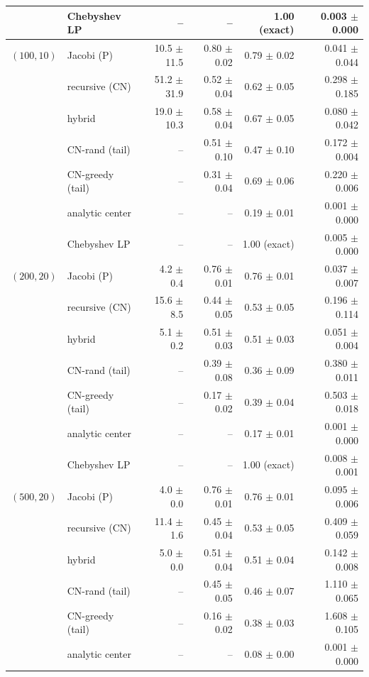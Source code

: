 \begin{table}[!htbp]
\begin{tabular}{llrrrr}
 & Chebyshev LP & -- & -- & 1.00 (exact) & 0.003 $\pm$ 0.000 \\
\midrule
$(100,10)$ & Jacobi (P) & 10.5 $\pm$ 11.5 & 0.80 $\pm$ 0.02 & 0.79 $\pm$ 0.02 & 0.041 $\pm$ 0.044 \\
 & recursive (CN) & 51.2 $\pm$ 31.9 & 0.52 $\pm$ 0.04 & 0.62 $\pm$ 0.05 & 0.298 $\pm$ 0.185 \\
 & hybrid & 19.0 $\pm$ 10.3 & 0.58 $\pm$ 0.04 & 0.67 $\pm$ 0.05 & 0.080 $\pm$ 0.042 \\
 & CN-rand (tail) & -- & 0.51 $\pm$ 0.10 & 0.47 $\pm$ 0.10 & 0.172 $\pm$ 0.004 \\
 & CN-greedy (tail) & -- & 0.31 $\pm$ 0.04 & 0.69 $\pm$ 0.06 & 0.220 $\pm$ 0.006 \\
 & analytic center & -- & -- & 0.19 $\pm$ 0.01 & 0.001 $\pm$ 0.000 \\
 & Chebyshev LP & -- & -- & 1.00 (exact) & 0.005 $\pm$ 0.000 \\
\midrule
$(200,20)$ & Jacobi (P) & 4.2 $\pm$ 0.4 & 0.76 $\pm$ 0.01 & 0.76 $\pm$ 0.01 & 0.037 $\pm$ 0.007 \\
 & recursive (CN) & 15.6 $\pm$ 8.5 & 0.44 $\pm$ 0.05 & 0.53 $\pm$ 0.05 & 0.196 $\pm$ 0.114 \\
 & hybrid & 5.1 $\pm$ 0.2 & 0.51 $\pm$ 0.03 & 0.51 $\pm$ 0.03 & 0.051 $\pm$ 0.004 \\
 & CN-rand (tail) & -- & 0.39 $\pm$ 0.08 & 0.36 $\pm$ 0.09 & 0.380 $\pm$ 0.011 \\
 & CN-greedy (tail) & -- & 0.17 $\pm$ 0.02 & 0.39 $\pm$ 0.04 & 0.503 $\pm$ 0.018 \\
 & analytic center & -- & -- & 0.17 $\pm$ 0.01 & 0.001 $\pm$ 0.000 \\
 & Chebyshev LP & -- & -- & 1.00 (exact) & 0.008 $\pm$ 0.001 \\
\midrule
$(500,20)$ & Jacobi (P) & 4.0 $\pm$ 0.0 & 0.76 $\pm$ 0.01 & 0.76 $\pm$ 0.01 & 0.095 $\pm$ 0.006 \\
 & recursive (CN) & 11.4 $\pm$ 1.6 & 0.45 $\pm$ 0.04 & 0.53 $\pm$ 0.05 & 0.409 $\pm$ 0.059 \\
 & hybrid & 5.0 $\pm$ 0.0 & 0.51 $\pm$ 0.04 & 0.51 $\pm$ 0.04 & 0.142 $\pm$ 0.008 \\
 & CN-rand (tail) & -- & 0.45 $\pm$ 0.05 & 0.46 $\pm$ 0.07 & 1.110 $\pm$ 0.065 \\
 & CN-greedy (tail) & -- & 0.16 $\pm$ 0.02 & 0.38 $\pm$ 0.03 & 1.608 $\pm$ 0.105 \\
 & analytic center & -- & -- & 0.08 $\pm$ 0.00 & 0.001 $\pm$ 0.000 \\

\end{tabular}
\end{table}
